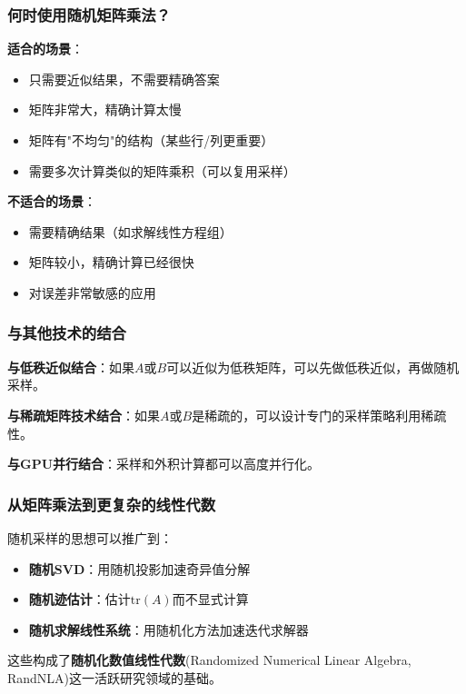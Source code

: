 \documentclass[11pt,a4paper]{ctexart}
\theoremstyle{definition}
\theoremstyle{remark}
\begin{document}
\subsubsection{何时使用随机矩阵乘法？}

\textbf{适合的场景}：
\begin{itemize}
    \item 只需要近似结果，不需要精确答案
    \item 矩阵非常大，精确计算太慢
    \item 矩阵有"不均匀"的结构（某些行/列更重要）
    \item 需要多次计算类似的矩阵乘积（可以复用采样）
\end{itemize}

\textbf{不适合的场景}：
\begin{itemize}
    \item 需要精确结果（如求解线性方程组）
    \item 矩阵较小，精确计算已经很快
    \item 对误差非常敏感的应用
\end{itemize}

\subsubsection{与其他技术的结合}

\textbf{与低秩近似结合}：如果$A$或$B$可以近似为低秩矩阵，可以先做低秩近似，再做随机采样。

\textbf{与稀疏矩阵技术结合}：如果$A$或$B$是稀疏的，可以设计专门的采样策略利用稀疏性。

\textbf{与GPU并行结合}：采样和外积计算都可以高度并行化。

\subsubsection{从矩阵乘法到更复杂的线性代数}

随机采样的思想可以推广到：
\begin{itemize}
    \item \textbf{随机SVD}：用随机投影加速奇异值分解
    \item \textbf{随机迹估计}：估计$\text{tr}(A)$而不显式计算
    \item \textbf{随机求解线性系统}：用随机化方法加速迭代求解器
\end{itemize}

这些构成了\textbf{随机化数值线性代数}(Randomized Numerical Linear Algebra, RandNLA)这一活跃研究领域的基础。
\end{document}
